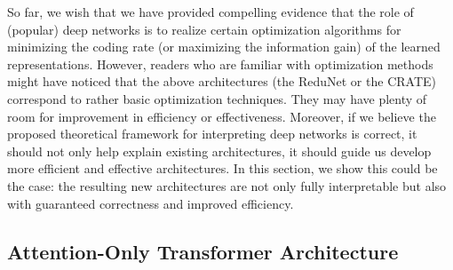 \documentclass[../../book-main.tex]{subfiles}
\begin{document}
So far, we wish that we have provided compelling evidence that the role of (popular) deep networks is to realize certain optimization algorithms for minimizing the coding rate (or maximizing the information gain) of the learned representations. However, readers who are familiar with optimization methods might have noticed that the above architectures (the ReduNet or the CRATE) correspond to rather basic optimization techniques. They may have plenty of room for improvement in efficiency or effectiveness. Moreover, if we believe the proposed theoretical framework for interpreting deep networks is correct, it should not only help explain existing architectures, it should guide us develop more efficient and effective architectures. In this section, we show this could be the case: the resulting new architectures are not only fully interpretable but also with guaranteed correctness and improved efficiency. 





\subsection{Attention-Only Transformer Architecture} \label{sub:aot}
\end{document}
